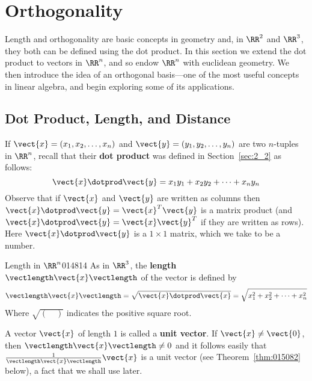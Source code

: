 
\section{Orthogonality}
\label{sec:5_3}

Length and orthogonality are basic concepts in geometry and, in $\RR^2$ and $\RR^3$, they both can be defined using the dot product. In this section we extend the dot product to vectors in $\RR^n$, and so endow $\RR^n$ with euclidean geometry. We then introduce the idea of an orthogonal basis---one of the most useful concepts in linear algebra, and begin exploring some of its applications.

\subsection*{Dot Product, Length, and Distance}

If $\vect{x} = (x_{1}, x_{2}, \dots, x_{n})$ and $\vect{y} =
(y_{1}, y_{2}, \dots, y_{n})$ are two $n$-tuples in $\RR^n$, recall
that their \textbf{dot product} was defined in Section~\ref{sec:2_2} as follows:
\begin{equation*}
\vect{x} \dotprod \vect{y} = x_1y_1 + x_2y_2 + \dots + x_ny_n
\end{equation*} 
Observe that if $\vect{x}$ and $\vect{y}$ are written as columns then
$\vect{x} \dotprod \vect{y} = \vect{x}^{T}\vect{y}$ is a matrix
product (and $\vect{x} \dotprod \vect{y} = \vect{x}\vect{y}^{T}$ if
they are written as rows). Here $\vect{x} \dotprod \vect{y}$ is a $1
\times 1 $ matrix, which we take to be a number.

\begin{definition}{Length in $\RR^n$}{014814} %
As in $\RR^3$, the \textbf{length} $\vectlength\vect{x}\vectlength$ of the vector is defined by
\begin{equation*}
\vectlength\vect{x}\vectlength = \sqrt{\vect{x}\dotprod\vect{x}} = \sqrt{x_1^2 + x_2^2 + \dots + x_n^2}
\end{equation*}
Where $\sqrt{(\quad )}$ indicates the positive square root.
\end{definition}

\noindent A vector $\vect{x}$ of length $1$ is called a \textbf{unit vector}. If $\vect{x} \neq \vect{0}$, then $\vectlength\vect{x}\vectlength \neq 0$ and it follows easily that 
$\frac{1}{\vectlength\vect{x}\vectlength}\vect{x}$ is a unit vector (see Theorem~\ref{thm:015082} below), a fact that we shall use later.

